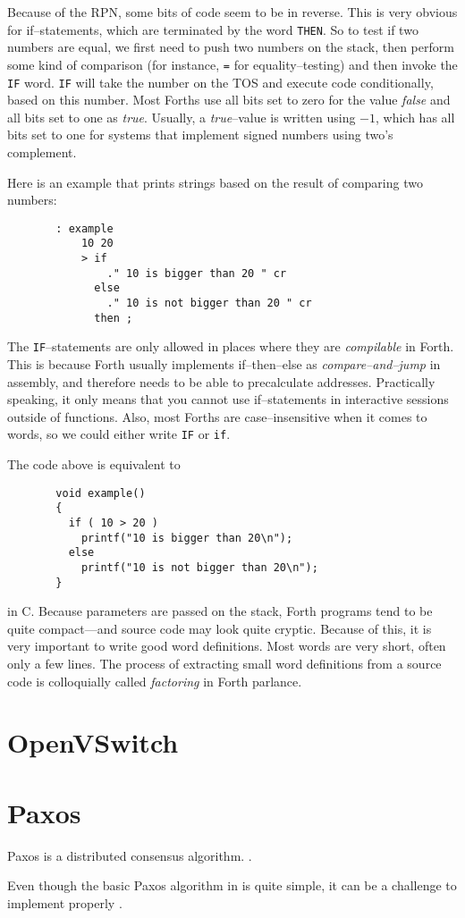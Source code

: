 Because of the \ac{RPN}, some bits of code seem to be in reverse.  This is
very obvious for if--statements, which are terminated by the word
\texttt{THEN}.  So to test if two numbers are equal, we first need to push
two numbers on the stack, then perform some kind of comparison (for
instance, \texttt{=} for equality--testing) and then invoke the
\texttt{IF} word.  \texttt{IF} will take the number on the \ac{TOS}
and execute code conditionally, based on this number.  Most Forths use all
bits set to zero for the value \textit{false} and all bits set to one as
\textit{true}.  Usually, a \textit{true}--value is written using $-1$,
which has all bits set to one for systems that implement signed numbers
using two's complement.

Here is an example that prints strings based on the result of comparing two
numbers:

\begin{figure}[H]
  \centering
  \begin{Verbatim}
  : example
      10 20
      > if
          ." 10 is bigger than 20 " cr
        else
          ." 10 is not bigger than 20 " cr
        then ;
  \end{Verbatim}
\end{figure}

The \texttt{IF}--statements are only allowed in places where they are
\textit{compilable} in Forth. This is because Forth usually implements
if--then--else as \textit{compare--and--jump} in assembly, and therefore
needs to be able to precalculate addresses.  Practically speaking, it only
means that you cannot use if--statements in interactive sessions outside of
functions.  Also, most Forths are case--insensitive when it comes to
words, so we could either write \texttt{IF} or \texttt{if}.

The code above is equivalent to

\begin{figure}[H]
  \centering
  \begin{Verbatim}
  void example()
  {
    if ( 10 > 20 )
      printf("10 is bigger than 20\n");
    else
      printf("10 is not bigger than 20\n");
  }
  \end{Verbatim}
\end{figure}

in C.  Because parameters are passed on the stack, Forth programs tend to be
quite compact---and source code may look quite cryptic.  Because of this, it
is very important to write good word definitions.  Most words are very
short, often only a few lines.  The process of extracting small word
definitions from a source code is colloquially called \textit{factoring} in
Forth parlance.

\section{OpenVSwitch}

\section{Paxos}
Paxos is a distributed consensus algorithm.
.

Even though the basic Paxos algorithm in \cite{Lam01} is quite simple, it can be
a challenge to implement properly \cite{Chandra:2007:PML:1281100.1281103}.
